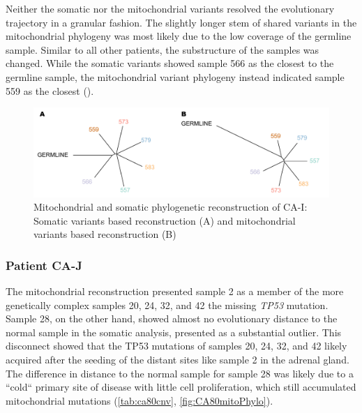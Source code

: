 Neither the somatic nor the mitochondrial variants resolved the evolutionary trajectory in a granular fashion. The slightly longer stem of shared variants in the mitochondrial phylogeny was most likely due to the low coverage of the germline sample. Similar to all other patients, the substructure of the samples was changed. While the somatic variants showed sample 566 as the closest to the germline sample, the mitochondrial variant phylogeny instead indicated sample 559 as the closest ().


\begin{figure}[ht]
\centering
\includegraphics[width=.99\linewidth]{Figures/CASCADE/mito/CA51SomVsMitoPhylo.pdf}
\caption[Mitochondrial and somatic phylogenetic reconstruction of CA-I]{Mitochondrial and somatic phylogenetic reconstruction of CA-I: Somatic variants based reconstruction (A) and mitochondrial variants based reconstruction (B)} \label{fig:CA51mitoPhylo}
\end{figure}


\subsubsection{Patient CA-J}

The mitochondrial reconstruction presented sample 2 as a member of the more genetically complex samples 20, 24, 32, and 42  the missing \textit{TP53} mutation. Sample 28, on the other hand, showed almost no evolutionary distance to the normal sample in the somatic analysis,  presented as a substantial outlier. This disconnect showed that the TP53 mutations of samples 20, 24, 32, and 42  likely acquired after the seeding of the distant sites like sample 2 in the adrenal gland. The difference in distance to the normal sample for sample 28 was likely due to a ``cold`` primary site of disease with little cell proliferation, which still accumulated mitochondrial mutations \cite{Abascal2021} (\autoref{tab:ca80cnv}, \autoref{fig:CA80mitoPhylo}).

